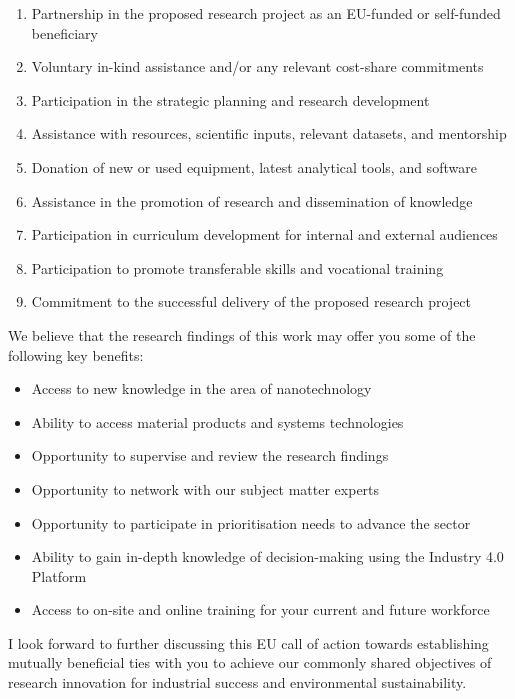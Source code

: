 \documentclass{materichLetter}
\begin{document}
\begin{enumerate}
\item Partnership in the proposed research project as an EU-funded
    or self-funded beneficiary
\item Voluntary in-kind assistance and/or any relevant cost-share
    commitments
\item Participation in the strategic planning and research
    development
\item Assistance with resources, scientific inputs, relevant
    datasets, and mentorship
\item Donation of new or used equipment, latest analytical tools,
    and software
\item Assistance in the promotion of research and dissemination of
    knowledge
\item Participation in curriculum development for internal and
    external audiences
\item Participation to promote transferable skills and vocational
    training
\item Commitment to the successful delivery of the proposed
    research project
\end{enumerate}

We believe that the research findings of this work may offer you some
of the following key benefits:
\begin{itemize}
\item Access to new knowledge in the area of nanotechnology
\item Ability to access material products and systems technologies
\item Opportunity to supervise and review the research findings
\item Opportunity to network with our subject matter experts
\item Opportunity to participate in prioritisation needs to advance
    the sector
\item Ability to gain in-depth knowledge of decision-making using
    the Industry 4.0 Platform
\item Access to on-site and online training for your current and
    future workforce
\end{itemize}
\par
\bigskip

I look forward to further discussing this EU call of action towards
establishing mutually beneficial ties with you to achieve our
commonly shared objectives of research innovation for industrial
success and environmental sustainability.
\end{document}
